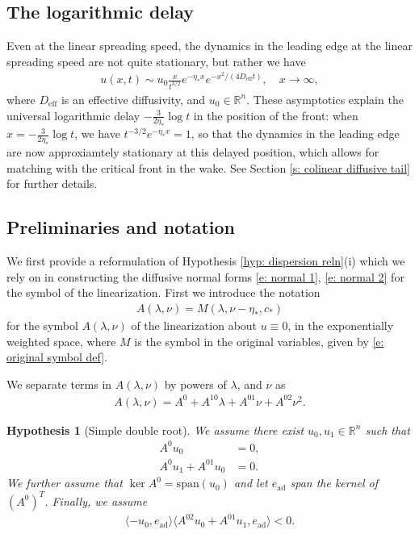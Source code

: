 \documentclass[11pt]{article}
\newcommand{\R}{\mathbb{R}}
\newcommand{\spn}{\text{\span}}
\newtheorem{hyp}{Hypothesis}
\numberwithin{equation}{section}
\numberwithin{prop}{section}
\renewcommand{\spn}{\mathrm{span}}
\begin{document}
\subsection{The logarithmic delay}\label{s: log delay}

Even at the linear spreading speed,  the dynamics in the leading edge at the linear spreading speed are not quite stationary, but rather we have
\begin{align}
u(x,t) \sim u_0 \frac{x}{t^{3/2}} e^{-\eta_* x} e^{-x^2/(4 D_\mathrm{eff} t)}, \quad x \to \infty,
\end{align}
where $D_\mathrm{eff}$ is an effective diffusivity, and $u_0 \in \R^n$. These asymptotics explain the universal logarithmic delay $-\frac{3}{2 \eta_*} \log t$ in the position of the front: when $x = -\frac{3}{2 \eta_*} \log t$, we have $t^{-3/2} e^{-\eta_* x} = 1$, so that the dynamics in the leading edge are now approxiamtely stationary at this delayed position, which allows for matching with the critical front in the wake. See Section \ref{s: colinear diffusive tail} for further details. 

\subsection{Preliminaries and notation}

We first provide a reformulation of Hypothesis \ref{hyp: dispersion reln}(i) which we rely on in constructing the diffusive normal forms \eqref{e: normal 1}, \eqref{e: normal 2} for the symbol of the linearization. First we introduce the notation
\begin{align}
A(\lambda, \nu) = M(\lambda, \nu -\eta_*, c_*) \label{e: symbol def}
\end{align}
for the symbol $A(\lambda, \nu)$ of the linearization about $u \equiv 0$, in the exponentially weighted space, where $M$ is the symbol in the original variables, given by \eqref{e: original symbol def}. 

We separate terms in $A(\lambda, \nu)$ by powers of $\lambda$, and $\nu$ as 
\begin{align}
A(\lambda, \nu) = A^0 + A^{10} \lambda + A^{01} \nu + A^{02} \nu^2. \label{e: A expansion}
\end{align}
\begin{hyp}[Simple double root] \label{hyp: DR matrix pencil}
	We assume there exist $u_0, u_1 \in \R^n$ such that 
	\begin{align}
	A^0 u_0 &= 0, \label{e: hyp kernel} \\ 
	A^0 u_1 + A^{01} u_0 &= 0. \label{e: hyp double root}
	\end{align}
	We further assume that $\ker A^0 = \spn (u_0)$ and let $e_\mathrm{ad}$ span the kernel of $(A^0)^T$. Finally, we assume
	\begin{align}
	\langle - u_0, e_\mathrm{ad} \rangle \langle A^{02} u_0 + A^{01} u_1, e_\mathrm{ad} \rangle < 0. \label{e: hyp simple DR}
	\end{align}
\end{hyp}
\end{document}
